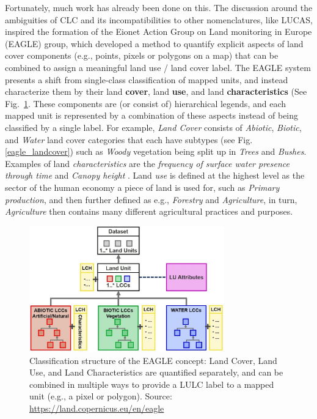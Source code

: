         Fortunately, much work has already been done on this. The discussion around the ambiguities of CLC and its incompatibilities to other nomenclatures, like LUCAS, inspired the formation of the Eionet Action Group on Land monitoring in Europe (EAGLE) group, which developed a method to quantify explicit aspects of land cover components (e.g., points, pixels or polygons on a map) that can be combined to assign a meaningful land use / land cover label. The EAGLE system presents a shift from single-class classification of mapped units, and instead characterize them by their land \textbf{cover}, land \textbf{use}, and land \textbf{characteristics} (See Fig.\@~\ref{fig:eagle_structure}. These components are (or consist of) hierarchical legends, and each mapped unit is represented by a combination of these aspects instead of being classified by a single label. For example, \textit{Land Cover} consists of \textit{Abiotic}, \textit{Biotic}, and \textit{Water} land cover categories that each have subtypes (see Fig.\@\ref{eagle_landcover}) such as \textit{Woody} vegetation being split up in \textit{Trees} and \textit{Bushes}. Examples of land \textit{characteristics} are the \textit{frequency of surface water presence through time} \citep{pekel2016high} and \textit{Canopy height} \citep{potapov2021mapping}. Land \textit{use} is defined at the highest level as the sector of the human economy a piece of land is used for, such as \textit{Primary production}, and then further defined as e.g., \textit{Forestry} and \textit{Agriculture}, in turn, \textit{Agriculture} then contains many different agricultural practices and purposes.
        
        \begin{figure}[H]
        \centering
        \includegraphics[width=0.75\textwidth]{figs_01/eagle_structure.png}
        \caption{Classification structure of the EAGLE concept: Land Cover, Land Use, and Land Characteristics are quantified separately, and can be combined in multiple ways to provide a LULC label to a mapped unit (e.g., a pixel or polygon). Source: \url{https://land.copernicus.eu/en/eagle}}
        \label{fig:eagle_structure}
        \end{figure}

